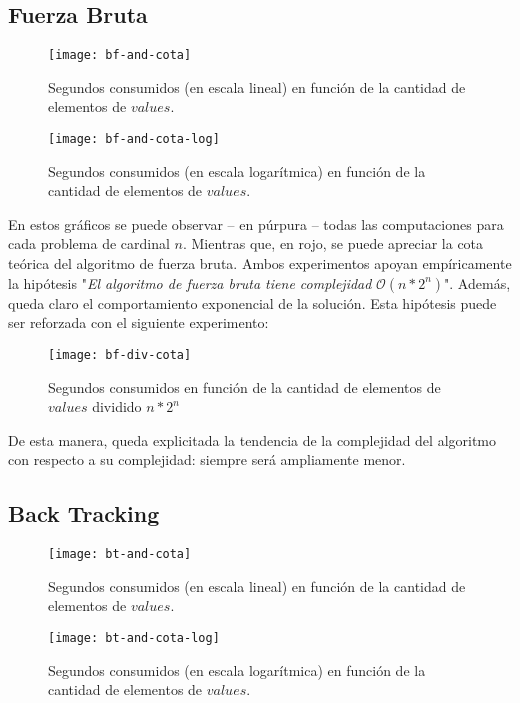 \subsection{Fuerza Bruta}
\begin{figure}[H]
	\centering
	\begin{minipage}{0.48\textwidth}
		\centering
		\texttt{[image: bf-and-cota]}
		\caption{\footnotesize Segundos consumidos (en escala lineal) en función de la cantidad de elementos de $values$.}
		\label{fig:plot-bf-and-cota}
	\end{minipage}%
	\hspace{0.03\textwidth}
	\begin{minipage}{0.48\textwidth}
		\centering
		\texttt{[image: bf-and-cota-log]}
		\caption{\footnotesize Segundos consumidos (en escala logarítmica) en función de la cantidad de elementos de $values$.}
		\label{fig:plot-bf-and-cota-log}
	\end{minipage}%
\end{figure}

En estos gráficos se puede observar – en púrpura – todas las computaciones para cada problema de cardinal $n$. Mientras que, en rojo, se puede apreciar la cota teórica del algoritmo de fuerza bruta. Ambos experimentos apoyan empíricamente la hipótesis "\textit{El algoritmo de fuerza bruta tiene complejidad} $\mathcal{O}(n*2^n)$". Además, queda claro el comportamiento exponencial de la solución. Esta hipótesis puede ser reforzada con el siguiente experimento:

\begin{figure}[H]
	\centering
	\texttt{[image: bf-div-cota]}
	\caption{\footnotesize Segundos consumidos en función de la cantidad de elementos de $values$ dividido $n*2^n$}
	\label{fig:plot-bf-div-cota}
\end{figure}

De esta manera, queda explicitada la tendencia de la complejidad del algoritmo con respecto a su complejidad: siempre será ampliamente menor.

\subsection{Back Tracking}
\begin{figure}[H]
	\centering
	\begin{minipage}{0.48\textwidth}
		\centering
		\texttt{[image: bt-and-cota]}
		\caption{\footnotesize Segundos consumidos (en escala lineal) en función de la cantidad de elementos de $values$.}
		\label{fig:plot-bt-and-cota}
	\end{minipage}%
	\hspace{0.03\textwidth}
	\begin{minipage}{0.48\textwidth}
		\centering
		\texttt{[image: bt-and-cota-log]}
		\caption{\footnotesize Segundos consumidos (en escala logarítmica) en función de la cantidad de elementos de $values$.}
		\label{fig:plot-bt-and-cota-log}
	\end{minipage}%
\end{figure}

